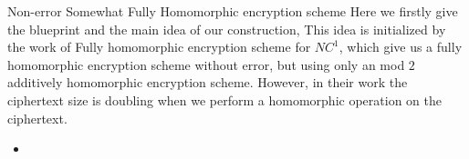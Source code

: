 \begin{section}{Non-error Somewhat Fully Homomorphic encryption scheme}
  Here we firstly give the blueprint and the main idea of our construction, This idea is initialized by the work of Fully homomorphic encryption scheme for $NC^1$, which give us a fully homomorphic encryption scheme without error, but using only an mod $2$ additively homomorphic encryption scheme. However, in their work the ciphertext size is doubling when we perform a homomorphic operation on the ciphertext.
  \begin{itemize}
  \item 
  \end{itemize}
\end{section}